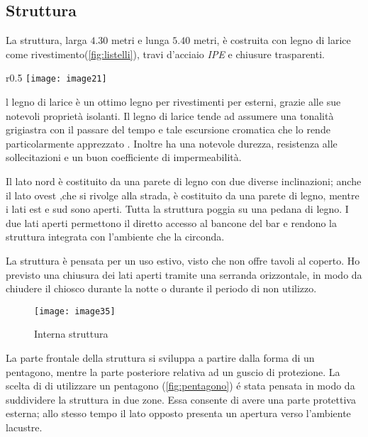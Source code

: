 \clearpage
\subsection{Struttura}


La struttura, larga $4.30$ metri e lunga $5.40$ metri, è costruita con legno di larice come rivestimento(\cref{fig:listelli}), travi  d'acciaio \textit{IPE}  e chiusure trasparenti.

\begin{wrapfigure}[11]{r}{0.5\textwidth}
	\centering
	\texttt{[image: image21]}
	\caption{Listelli in legno}
	\label{fig:listelli}
\end{wrapfigure}

l legno di larice è un ottimo legno per rivestimenti per esterni, grazie alle sue notevoli proprietà isolanti. Il legno di larice tende ad assumere una tonalità grigiastra con il passare del tempo e tale escursione cromatica che lo rende particolarmente apprezzato . Inoltre ha una notevole durezza, resistenza alle sollecitazioni e un buon coefficiente di impermeabilità. 

Il lato nord è costituito da una parete di legno con due diverse inclinazioni; anche il lato ovest ,che si rivolge alla strada, è costituito da una parete di legno, mentre i lati est e sud sono aperti. Tutta la struttura poggia su una pedana di legno. I due lati aperti permettono il diretto accesso al bancone del bar e rendono la struttura integrata con l’ambiente che la circonda. 

La struttura è pensata per un uso estivo, visto che non offre tavoli al coperto. 
Ho previsto una chiusura dei lati aperti tramite una serranda orizzontale, 
in modo da chiudere il chiosco durante la notte o durante il periodo di non utilizzo. 

\begin{figure}[H]
	\centering
	\texttt{[image: image35]}
	\caption{Interna struttura}
	\label{fig:pedana}
\end{figure}

\clearpage
La parte frontale della struttura si sviluppa a partire dalla forma di un pentagono, mentre la parte posteriore relativa ad un guscio di protezione. La scelta di di utilizzare un pentagono (\cref{fig:pentagono}) é stata pensata in modo da suddividere la struttura in due zone. Essa consente di avere una parte protettiva esterna; allo stesso tempo il lato opposto presenta un apertura verso l'ambiente lacustre.

